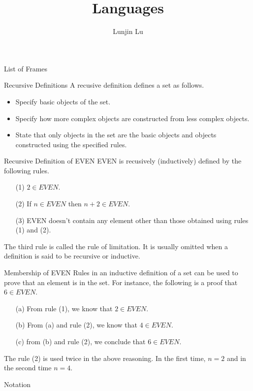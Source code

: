 \documentclass[notes=none]{beamer}
\title{Languages}
\author{Lunjin Lu}
\date{}
\makeatletter
\newif\ifframeinlbf
\newcommand\listofframes{\@starttoc{lbf}}
\makeatother
\begin{document}
\begin{comment}
\end{comment}
\frameinlbffalse
\begin{frame}{List of Frames}
    \listofframes
\end{frame}
\frameinlbftrue


\frame{ \titlepage
}

\begin{frame}{Recursive Definitions}
A recusive definition defines a set as follows.
\begin{itemize}
  \item Specify basic objects of the set.
  \item Specify how more complex objects
        are constructed from less complex objects. 
  \item State that only objects in the set are the 
  	basic objects and objects  constructed using the specified rules. 
\end{itemize}

\end{frame}

\begin{frame}{Recursive Definition of EVEN}
EVEN is recusively (inductively) defined by the following rules. 
\begin{itemize}
  \item [(1)]  $2\in EVEN$.
  \item [(2)] If $n\in EVEN$ then $n+2\in EVEN$.
  \item [(3)] EVEN doesn't contain any element other than those obtained using rules (1) and (2).
\end{itemize}

The third rule is called the rule of limitation. It is usually omitted 
when a definition is said to be recursive or inductive. 

\end{frame}

\begin{frame}{Membership of EVEN}
Rules in an inductive definition of a set can be used to 
prove that an element is in the set. For instance, 
the following is a proof that $6\in EVEN$.
\begin{itemize}
  \item [(a)] From rule (1), we know that  $2\in EVEN$.
  \item [(b)] From (a) and rule (2), we know that $4\in EVEN$. 
  \item [(c)] from (b) and rule (2), we conclude that $6\in EVEN$. 
\end{itemize}

The rule (2) is used twice in the above reasoning. 
In the first time, $n=2$ and in the second time $n=4$.
\end{frame}

\begin{frame}{Notation}

\end{frame}
\end{document}
